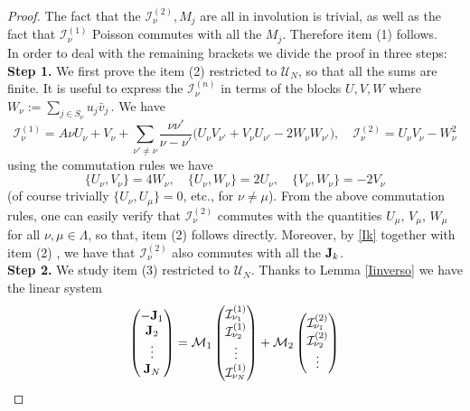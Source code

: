 \documentclass[reqno,11pt]{amsart}
\theoremstyle{plain}
\numberwithin{equation}{section}
\newcommand{\M}{\mathcal{M}}
\newcommand{\I}{{\texttt{\bf J}}}
\newcommand{\J}{{\texttt{\bf J}}}
\newcommand{\cI}{{\mathcal I}}
\begin{document}
{\begin{proof}
The fact that the $\cI^{(2)}_\nu,M_j$ are all in involution is trivial, as well as the fact that $\cI^{(1)}_\nu$ Poisson commutes with all the $M_j$. Therefore item (1) follows.\\
In order to deal with the remaining brackets we divide the proof in three steps:\\
{\bf Step 1. } We first prove the item (2)  restricted to $\mathscr{U}_N$, so that all the sums are finite.
It is useful to express  the $\cI^{(n)}_\nu$ in terms of the blocks $U,V,W$ where $W_\nu:=\sum_{j\in S_\nu} u_j\bar v_j$\,.
We have
\begin{equation}\label{eq:Gamma1_macro}
	\cI_\nu^{(1)} = A \nu U_\nu + V_\nu + \sum_{\nu' \ne \nu} \frac{\nu \nu'}{\nu - \nu'} \big( U_\nu V_{\nu'} + V_\nu U_{\nu'} - 2 W_\nu W_{\nu'} \big),\quad \cI_{\nu}^{(2)} = U_{\nu}V_{\nu} - W_{\nu}^2
\end{equation}
using the commutation rules we have
\begin{equation}
	\{U_\nu, V_\nu\} = 4W_\nu, \quad \{U_\nu, W_\nu\} = 2U_\nu, \quad \{V_\nu, W_\nu\} = -2V_\nu
\end{equation}
(of course trivially $\{U_\nu, U_\mu\} = 0$, etc., for $\nu \ne \mu$).
From the above commutation rules, one can easily verify that $\cI^{(2)}_\nu$ commutes with the quantities $U_\mu,\,V_\mu,\,W_\mu$ for all $\nu,\mu\in\Lambda$, so that, item (2) follows directly. Moreover, by \eqref{Ik} together with item (2) , we have that $\cI_\nu^{(2)}$ also commutes with all the $\I_k$.\\
{\bf Step 2. }We study item (3) restricted to $\mathscr{U}_N$. Thanks to Lemma \ref{Iinverso} we have the linear system
\begin{equation}
	\begin{pmatrix}
		-\I_1\\
\J_2\\		\vdots\\
		\I_N
	\end{pmatrix}=\M_1
	\begin{pmatrix}
		\cI^{(1)}_{\nu_1}\\
			\cI^{(1)}_{\nu_2}\\
		\vdots\\
		\cI^{(1)}_{\nu_N}
	\end{pmatrix}+\M_2\begin{pmatrix}
		\cI^{(2)}_{\nu_1}\\
			\cI^{(2)}_{\nu_2}\\
		\vdots\\

\end{pmatrix}
\end{equation}
\end{proof}}
\end{document}
